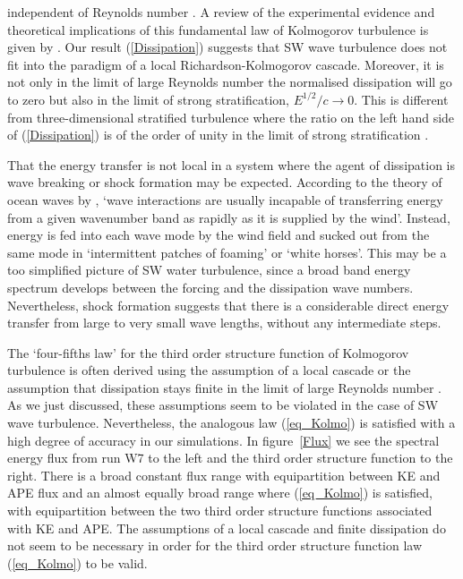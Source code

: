 \documentclass{jfm}
\begin{document}
independent of Reynolds number \cite[]{Pope, TennekesLumley}. A review of the
experimental evidence and theoretical implications of this fundamental law of
Kolmogorov turbulence is given by \cite{Vassilicos2015}. Our result
(\ref{Dissipation}) suggests that SW wave turbulence does not fit into the
paradigm of a local Richardson-Kolmogorov cascade. Moreover, it is not only in
the limit of large Reynolds number the normalised dissipation will go to zero
but also in the limit of strong stratification, $ E^{1/2}/c \rightarrow 0 $.
This is different from three-dimensional stratified turbulence where the ratio
on the left hand side of (\ref{Dissipation}) is of the order of unity in the
limit of strong stratification \cite[]{Lindborg2006, Brethouwer2007}.

That the energy transfer is not local in a system where the agent of dissipation is wave breaking or shock formation may be expected. According to the theory of ocean waves by  \cite{Phillips}, 
`wave interactions are usually incapable of transferring energy from a given wavenumber
band as rapidly as it is supplied by the wind'. Instead, energy is fed into each wave mode by the
wind field and sucked out from the same mode in `intermittent patches of foaming'
or `white horses'.  This may be a too simplified picture of SW water turbulence, since a broad band energy spectrum develops between the forcing and the dissipation wave numbers. 
Nevertheless,  shock formation suggests that there is a considerable direct energy transfer from large to very small wave lengths, without any intermediate steps. 


The `four-fifths law' for the third order structure function of Kolmogorov
turbulence is often derived using the assumption of a local cascade
\cite[]{Vassilicos2015} or the assumption that dissipation stays finite in the
limit of large Reynolds number \cite[]{Frisch}. As we just discussed, these
assumptions seem to be violated in the case of SW wave turbulence.
Nevertheless, the analogous law (\ref{eq_Kolmo}) is satisfied with a high degree of accuracy in our simulations. In
figure~\ref{Flux} we see the spectral energy flux from run W7 to the left and
the third order structure function to the right. There is a broad constant flux
range with equipartition between KE and APE flux and an almost equally broad
range where (\ref{eq_Kolmo}) is satisfied, with equipartition between the two
third order structure functions associated with KE and APE. The assumptions of
a local cascade and finite dissipation do not seem to be necessary in order for
the third order structure function law (\ref{eq_Kolmo}) to be valid.
\end{document}
